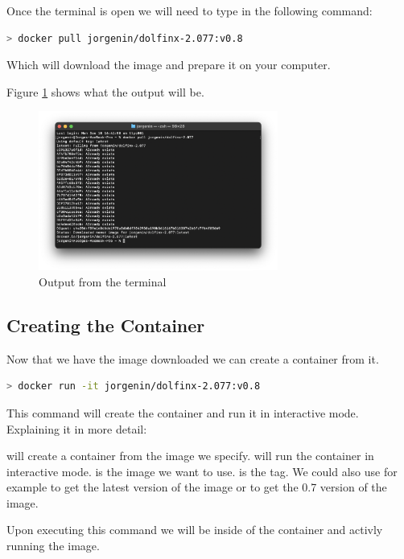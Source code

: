 \documentclass[final]{article}
\numberwithin{equation}{section}
\theoremstyle{remarkStyle}
\begin{document}
Once the terminal is open we will need to type in the following command:

\begin{lstlisting}[language=bash, caption=Docker Pull Command]
  > docker pull jorgenin/dolfinx-2.077:v0.8
\end{lstlisting}

Which will download the image and prepare it on your computer.

Figure \ref{fig:Terminal_pull_done} shows what the output will be.
\begin{figure}[H]
  \centering
  \includegraphics[width=0.7\textwidth]{TerminalImage_pull.png}
  \caption{Output from the terminal}%
  \label{fig:Terminal_pull_done}%
\end{figure}

\subsection{Creating the Container}
Now that we have the image downloaded we can create a container from it.
\begin{lstlisting}[language=bash, caption=Docker Pull Command]
  > docker run -it jorgenin/dolfinx-2.077:v0.8
\end{lstlisting}

This command will create the container and run it in interactive mode.
Explaining it in more detail:

 will create a container from the image we specify.  will run the container in interactive mode.  is the image we want to use.
 is the tag. We could also use for example  to get the latest version of the image or  to get the 0.7 version of the image.


Upon executing this command we will be inside of the container and activly running the image.
\end{document}
